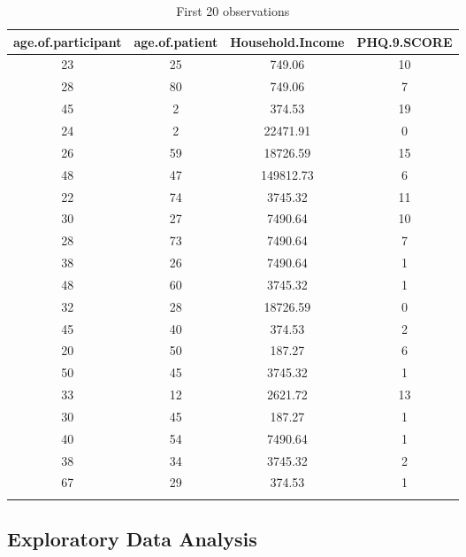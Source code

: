 \documentclass[11pt]{article}\usepackage[]{graphicx}\usepackage[]{xcolor}
\numberwithin{equation}{section}
\numberwithin{table}{section}
\begin{document}
\begin{longtable}[t]{|c|c|c|c|}
	\hline
	age.of.participant & age.of.patient & Household.Income & PHQ.9.SCORE\\
	\hline
	23 & 25 & 749.06 & 10\\
	28 & 80 & 749.06 & 7\\
	45 & 2 & 374.53 & 19\\
	24 & 2 & 22471.91 & 0\\
	26 & 59 & 18726.59 & 15\\
	
	48 & 47 & 149812.73 & 6\\
	22 & 74 & 3745.32 & 11\\
	30 & 27 & 7490.64 & 10\\
	28 & 73 & 7490.64 & 7\\
	38 & 26 & 7490.64 & 1\\
	
	48 & 60 & 3745.32 & 1\\
	32 & 28 & 18726.59 & 0\\
	45 & 40 & 374.53 & 2\\
	20 & 50 & 187.27 & 6\\
	50 & 45 & 3745.32 & 1\\
	
	33 & 12 & 2621.72 & 13\\
	30 & 45 & 187.27 & 1\\
	40 & 54 & 7490.64 & 1\\
	38 & 34 & 3745.32 & 2\\
	67 & 29 & 374.53 & 1\\
	\hline
	
	\caption{\label{tab:table 1}First 20 observations}
\end{longtable}

\subsection{Exploratory Data Analysis}
\end{document}
